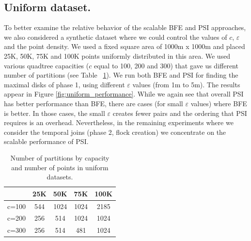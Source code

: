 \subsection{Uniform dataset.}
To better examine the relative behavior of the scalable BFE and PSI approaches, we also considered a synthetic dataset where we could control the values of $c$, $\varepsilon$ and the point density. We used a fixed square area of 1000m x 1000m and placed 25K, 50K, 75K and 100K points uniformly distributed in this area. 
We used various quadtree capacities ($c$ equal to 100, 200 and 300) that gave us different number of partitions (see Table ~\ref{tab:uniform_ncells}). We run both BFE and PSI for finding the maximal disks of phase 1, using different $\varepsilon$ values (from 1m to 5m). The results appear in Figure \ref{fig:uniform_performance}. While we again see that overall PSI has better performance than BFE, there are cases (for small $\varepsilon$ values) where BFE is better. In those cases, the small $\varepsilon$ creates fewer pairs and the ordering that PSI requires is an overhead. Nevertheless, in the remaining experiments where we consider the temporal joins (phase 2, flock creation) we concentrate on the scalable performance of PSI. 

\begin{table}
    \centering
    \begin{tabular}{c|cccc}
              & 25K & 50K  & 75K  & 100K \\
        \hline
        c=100 & 544 & 1024 & 1024 & 2185 \\
        c=200 & 256 & 514  & 1024 & 1024 \\
        c=300 & 256 & 514  & 481  & 1024 \\
    \end{tabular}
    \caption{Number of partitions by capacity and number of points in uniform datasets.}
    \label{tab:uniform_ncells}
\end{table}

